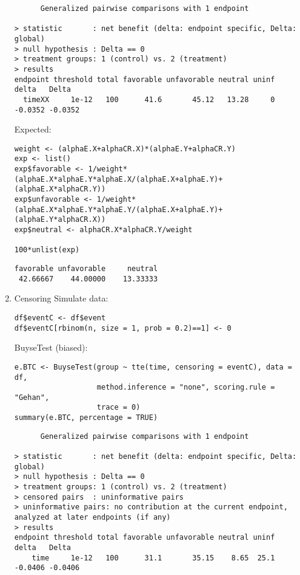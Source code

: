 \documentclass[12pt]{article}
\begin{document}
\begin{enumerate}
\begin{verbatim}
      Generalized pairwise comparisons with 1 endpoint

> statistic       : net benefit (delta: endpoint specific, Delta: global) 
> null hypothesis : Delta == 0 
> treatment groups: 1 (control) vs. 2 (treatment) 
> results
endpoint threshold total favorable unfavorable neutral uninf   delta   Delta
  timeXX     1e-12   100      41.6       45.12   13.28     0 -0.0352 -0.0352
\end{verbatim}

Expected:
\lstset{language=r,label= ,caption= ,captionpos=b,numbers=none}
\begin{lstlisting}
weight <- (alphaE.X+alphaCR.X)*(alphaE.Y+alphaCR.Y)
exp <- list()
exp$favorable <- 1/weight*(alphaE.X*alphaE.Y*alphaE.X/(alphaE.X+alphaE.Y)+(alphaE.X*alphaCR.Y))
exp$unfavorable <- 1/weight*(alphaE.X*alphaE.Y*alphaE.Y/(alphaE.X+alphaE.Y)+(alphaE.Y*alphaCR.X))
exp$neutral <- alphaCR.X*alphaCR.Y/weight

100*unlist(exp)
\end{lstlisting}

\begin{verbatim}
favorable unfavorable     neutral 
 42.66667    44.00000    13.33333
\end{verbatim}

\item Censoring
\label{sec:orgced04b7}
Simulate data:
\lstset{language=r,label= ,caption= ,captionpos=b,numbers=none}
\begin{lstlisting}
df$eventC <- df$event
df$eventC[rbinom(n, size = 1, prob = 0.2)==1] <- 0
\end{lstlisting}

BuyseTest (biased):
\lstset{language=r,label= ,caption= ,captionpos=b,numbers=none}
\begin{lstlisting}
e.BTC <- BuyseTest(group ~ tte(time, censoring = eventC), data = df,
				   method.inference = "none", scoring.rule = "Gehan",
				   trace = 0)
summary(e.BTC, percentage = TRUE)
\end{lstlisting}

\begin{verbatim}
      Generalized pairwise comparisons with 1 endpoint

> statistic       : net benefit (delta: endpoint specific, Delta: global) 
> null hypothesis : Delta == 0 
> treatment groups: 1 (control) vs. 2 (treatment) 
> censored pairs  : uninformative pairs
> uninformative pairs: no contribution at the current endpoint, analyzed at later endpoints (if any)
> results
endpoint threshold total favorable unfavorable neutral uninf   delta   Delta
    time     1e-12   100      31.1       35.15    8.65  25.1 -0.0406 -0.0406
\end{verbatim}


\end{enumerate}
\end{document}
